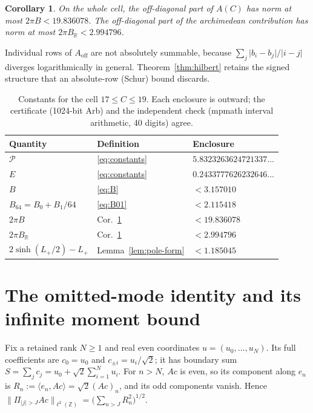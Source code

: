 \documentclass[11pt,a4paper]{article}
\newtheorem{corollary}[theorem]{Corollary}
\theoremstyle{definition}
\newcommand{\Z}{\mathbb{Z}}
\newcommand{\R}{\mathbb{R}}
\newcommand{\ip}[2]{\langle #1,#2\rangle}
\newcommand{\norm}[1]{\lVert #1\rVert}
\newcommand{\abs}[1]{\lvert #1\rvert}
\newcommand{\Lmax}{L_{+}}
\begin{document}
\begin{corollary}\label{cor:offdiag}
On the whole cell, the off-diagonal part of $A(C)$ has norm at most
$2\pi B<19.836078$. The off-diagonal part of the archimedean contribution
has norm at most $2\pi B_\R<2.994796$.
\end{corollary}

Individual rows of $A_{\mathrm{off}}$ are not absolutely summable, because
$\sum_j\abs{b_i-b_j}/\abs{i-j}$ diverges logarithmically in general.
Theorem~\ref{thm:hilbert} retains the signed structure that an
absolute-row (Schur) bound discards.

\begin{table}[ht]
\centering
\caption{Constants for the cell $17\le C\le19$. Each enclosure is outward;
the certificate (1024-bit Arb) and the independent check (mpmath interval
arithmetic, 40 digits) agree.}\label{tab:constants}
\begin{tabular}{@{}lll@{}}
\toprule
Quantity & Definition & Enclosure\\
\midrule
$\mathcal P$ & \eqref{eq:constants} & $5.8323263624721337\ldots$\\
$E$ & \eqref{eq:constants} & $0.2433777626232646\ldots$\\
$B$ & \eqref{eq:B} & $<3.157010$\\
$B_{64}=B_0+B_1/64$ & \eqref{eq:B01} & $<2.115418$\\
$2\pi B$ & Cor.~\ref{cor:offdiag} & $<19.836078$\\
$2\pi B_\R$ & Cor.~\ref{cor:offdiag} & $<2.994796$\\
$2\sinh(\Lmax/2)-\Lmax$ & Lemma~\ref{lem:pole-form} & $<1.185045$\\
\bottomrule
\end{tabular}
\end{table}

\section{The omitted-mode identity and its infinite moment bound}\label{sec:tail}

Fix a retained rank $N\ge1$ and real even coordinates $u=(u_0,\dots,u_N)$.
Its full coefficients are $c_0=u_0$ and $c_{\pm i}=u_i/\sqrt2$; it has
boundary sum $S=\sum_jc_j=u_0+\sqrt2\sum_{i=1}^Nu_i$. For $n>N$, $Ac$ is
even, so its component along $e_n$ is
$R_n:=\ip{e_n}{Ac}=\sqrt2(Ac)_n$, and its odd components vanish. Hence
$\norm{\Pi_{\abs j>J}Ac}_{\ell^2(\Z)}=\bigl(\sum_{n>J}R_n^2\bigr)^{1/2}$.
\end{document}

